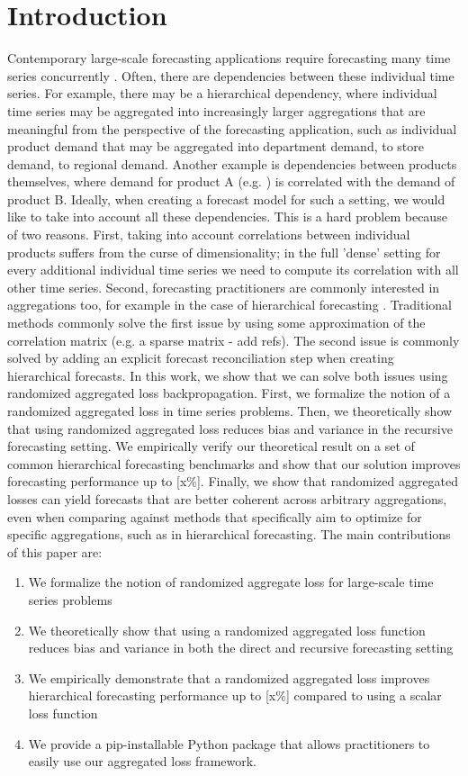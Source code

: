 \documentclass{article}
\begin{document}
\section{Introduction}
  Contemporary large-scale forecasting applications require forecasting many time series concurrently \cite{bose_probabilistic_2017}. Often, there are dependencies between these individual time series. For example, there may be a hierarchical dependency, where individual time series may be aggregated into increasingly larger aggregations that are meaningful from the perspective of the forecasting application, such as individual product demand that may be aggregated into department demand, to store demand, to regional demand. Another example is dependencies between products themselves, where demand for product A (e.g. ) is correlated with the demand of product B. Ideally, when creating a forecast model for such a setting, we would like to take into account all these dependencies. This is a hard problem because of two reasons. First, taking into account correlations between individual products suffers from the curse of dimensionality; in the full 'dense' setting for every additional individual time series we need to compute its correlation with all other time series. Second, forecasting practitioners are commonly interested in aggregations too, for example in the case of hierarchical forecasting \cite{hyndman_optimal_2011}. Traditional methods commonly solve the first issue by using some approximation of the correlation matrix (e.g. a sparse matrix - add refs). The second issue is commonly solved by adding an explicit forecast reconciliation step when creating hierarchical forecasts. In this work, we show that we can solve both issues using randomized aggregated loss backpropagation. First, we formalize the notion of a randomized aggregated loss in time series problems. Then, we theoretically show that using randomized aggregated loss reduces bias and variance in the recursive forecasting setting. We empirically verify our theoretical result on a set of common hierarchical forecasting benchmarks and show that our solution improves forecasting performance up to [x\%]. Finally, we show that randomized aggregated losses can yield forecasts that are better coherent across arbitrary aggregations, even when comparing against methods that specifically aim to optimize for specific aggregations, such as in hierarchical forecasting. The main contributions of this paper are:
  \begin{enumerate}
    \item We formalize the notion of randomized aggregate loss for large-scale time series problems
    \item We theoretically show that using a randomized aggregated loss function reduces bias and variance in both the direct and recursive forecasting setting
    \item We empirically demonstrate that a randomized aggregated loss improves hierarchical forecasting performance up to [x\%] compared to using a scalar loss function
    \item We provide a pip-installable Python package that allows practitioners to easily use our aggregated loss framework.
  \end{enumerate}
\end{document}
